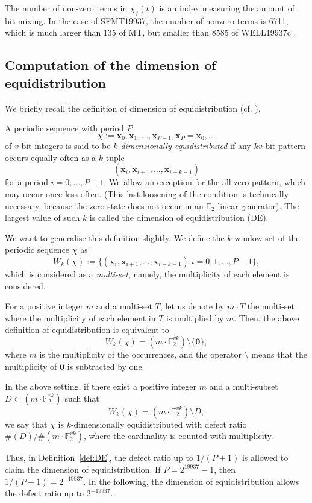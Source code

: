 \documentclass{svmult}
\def\F2{{\mathbb F}_2}
\def\bx{{{\mathbf x}}}
\begin{document}
\begin{remark}
The number of non-zero terms in $\chi_f(t)$ is 
an index measuring the amount of bit-mixing. 
In the case of SFMT19937, the number of nonzero 
terms is 6711, which is much larger than 135 of MT, 
but smaller than 8585 of WELL19937c \cite{WELL}. 
\end{remark}

\subsection{Computation of the dimension of equidistribution}
\label{sec:DE}
We briefly recall the definition of dimension of 
equidistribution (cf. \cite{CLT}). 
\begin{definition}\label{def:DE}
A periodic sequence with period $P$
$$\chi:=\bx_0, \bx_1, \ldots, \bx_{P-1}, \bx_P=\bx_0, \ldots$$
of $v$-bit integers is said to be {\em $k$-dimensionally equidistributed}
if any $kv$-bit pattern occurs equally often as a $k$-tuple
$$
(\bx_i, \bx_{i+1}, \ldots, \bx_{i+k-1})
$$
for a period $i=0,\ldots, P-1$.
We allow an exception for 
the all-zero pattern, which may occur once less often.
(This last loosening of the condition is technically
necessary, because the zero state does not occur
in an $\F2$-linear generator). 
The largest value of such $k$ is called the dimension 
of equidistribution (DE).
\end{definition}

We want to generalise this definition slightly.
We define the $k$-window set of the periodic sequence $\chi$
as
$$
W_k(\chi):=
\{(\bx_i, \bx_{i+1}, \ldots, \bx_{i+k-1}) | 
i =0,1,\ldots, P-1\},
$$
which is considered as a {\em multi-set}, namely, 
the multiplicity of each element is considered. 

For a positive integer $m$ and a multi-set $T$,
let us denote by $m \cdot T$ the multi-set 
where the multiplicity of each element in $T$ is
multiplied by $m$. Then, the above definition of
equidistribution is equivalent to 
$$
W_k(\chi)=(m\cdot \F2^{vk}) \setminus \{{\mathbf 0}\},
$$
where $m$ is the multiplicity of the occurrences,
and the operator $\setminus$ means that the multiplicity
of ${\mathbf 0}$ is subtracted by one. 

\begin{definition}
In the above setting, if there exist a positive integer $m$ 
and a multi-subset
$D \subset (m\cdot \F2^{vk})$
such that
$$
W_k(\chi)=(m\cdot \F2^{vk}) \setminus D,
$$
we say that $\chi$ is $k$-dimensionally equidistributed 
with defect ratio $\#(D)/\#(m \cdot \F2^{vk})$, 
where the cardinality is counted with multiplicity. 
\end{definition}
Thus, in Definition~\ref{def:DE}, the defect ratio up to $1/(P+1)$
is allowed to claim the dimension of equidistribution.
If $P=2^{19937}-1$, then $1/(P+1)=2^{-19937}$. 
In the following, the dimension of equidistribution 
allows the defect ratio up to $2^{-19937}$. 
\end{document}
